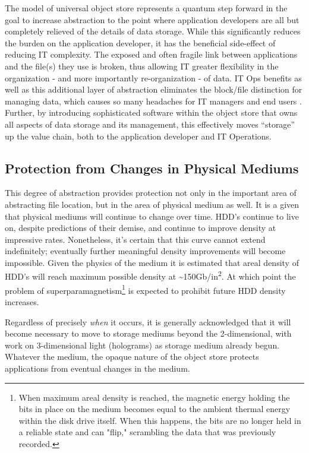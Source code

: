 The model of universal object store represents a quantum step forward in
the goal to increase abstraction to the point where application
developers are all but completely relieved of the details of data
storage. While this significantly reduces the burden on the application
developer, it has the beneficial side-effect of reducing IT complexity.
The exposed and often fragile link between applications and the file(s)
they use is broken, thus allowing IT greater flexibility in the
organization - and more importantly re-organization - of data. IT Ops
benefits as well as this additional layer of abstraction eliminates the
block/file distinction for managing data, which causes so many headaches
for IT managers and end users \cite{ref3}. Further, by introducing
sophisticated software within the object store that owns all aspects of
data storage and its management, this effectively moves ``storage'' up
the value chain, both to the application developer and IT Operations.

\subsection{Protection from Changes in Physical
Mediums}

This degree of abstraction provides protection not only in the important
area of abstracting file location, but in the area of physical medium as
well. It is a given that physical mediums will continue to change over
time. HDD's continue to live on, despite predictions of their demise,
and continue to improve density at impressive rates. Nonetheless, it's
certain that this curve cannot extend indefinitely; eventually further
meaningful density improvements will become impossible. Given the
physics of the medium it is estimated that areal density of HDD's will
reach maximum possible density at
\textasciitilde150Gb/in\textsuperscript{2}. At which point the problem
of superparamagnetism\footnote{When maximum areal density is reached,
  the magnetic energy holding the bits in place on the medium becomes
  equal to the ambient thermal energy within the disk drive itself. When
  this happens, the bits are no longer held in a reliable state and can
  "flip," scrambling the data that was previously recorded.} is expected
to prohibit future HDD density increases.

Regardless of precisely \emph{when} it occurs, it is generally
acknowledged that it will become necessary to move to storage mediums
beyond the 2-dimensional, with work on 3-dimensional light (holograms)
as storage medium already begun. Whatever the medium, the opaque nature
of the object store protects applications from eventual changes in the
medium.

